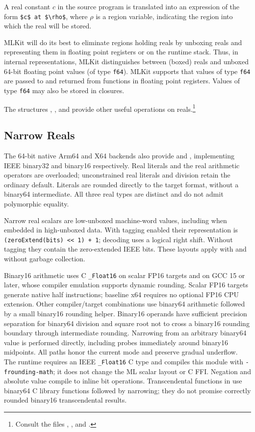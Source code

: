 \documentclass[12pt]{book}
\begin{document}
A real constant $c$ in the source program is translated into an expression of
the form
%
%
\lstinline!$c$ at $\rho$!, where $\rho$ is a region variable, indicating the
region into which the real will be stored.

MLKit will do its best to eliminate regions holding reals by unboxing reals
and representing them in floating point registers or on the runtime stack. Thus,
in internal representations, MLKit distinguishes between (boxed) reals and
unboxed 64-bit floating point values (of type \lstinline{f64}). MLKit supports that
values of type \lstinline{f64} are passed to and returned from functions in
floating point registers. Values of type \lstinline{f64} may also be stored in
closures.

The structures , , and  provide other
useful operations on reals.\footnote{Consult the files ,
, and .}

\subsection{Narrow Reals}

The 64-bit native Arm64 and X64 backends also provide  and
, implementing IEEE binary32 and binary16 respectively. Real
literals and the real arithmetic operators are overloaded; unconstrained
real literals and division retain the ordinary  default. Literals
are rounded directly to the target format, without a binary64 intermediate.
All three real types are distinct and do not admit polymorphic equality.

Narrow real scalars are low-unboxed machine-word values, including when
embedded in high-unboxed data. With tagging enabled their representation is
\texttt{(zeroExtend(bits) << 1) + 1}; decoding uses a logical right shift.
Without tagging they contain the zero-extended IEEE bits. These layouts
apply with and without garbage collection.

Binary16 arithmetic uses C \texttt{\_Float16} on scalar FP16 targets and
on GCC 15 or later, whose compiler emulation supports dynamic rounding.
Scalar FP16 targets generate native half instructions; baseline x64 requires
no optional FP16 CPU extension. Other compiler/target combinations use
binary64 arithmetic followed by a small binary16 rounding helper. Binary16
operands have sufficient precision separation for binary64 division and
square root not to cross a binary16 rounding boundary through intermediate
rounding. Narrowing from an arbitrary binary64 value is performed directly,
including probes immediately around binary16 midpoints. All paths honor
the current  mode and preserve gradual underflow. The runtime
requires an IEEE \texttt{\_Float16} C type and compiles this module with
\texttt{-frounding-math}; it does not change the ML scalar layout or C FFI.
Negation and absolute value compile to inline bit operations. Transcendental
functions in  use binary64 C library functions followed by narrowing;
they do not promise correctly rounded binary16 transcendental results.
\end{document}
